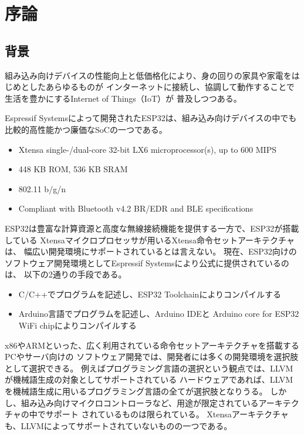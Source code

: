 \chapter{序論}
\label{chap:introduction}

\section{背景}
\label{section:background}

組み込み向けデバイスの性能向上と低価格化により、身の回りの家具や家電をはじめとしたあらゆるものが
インターネットに接続し、協調して動作することで生活を豊かにするInternet of Things（IoT）が
普及しつつある。

Espressif Systemsによって開発されたESP32\cite{esp32}は、組み込み向けデバイスの中でも
比較的高性能かつ廉価なSoCの一つである。

\begin{itemize}
  \item Xtensa single-/dual-core 32-bit LX6 microprocessor(s), up to 600 MIPS
  \item 448 KB ROM, 536 KB SRAM
  \item 802.11 b/g/n
  \item Compliant with Bluetooth v4.2 BR/EDR and BLE specifications
\end{itemize}

ESP32は豊富な計算資源と高度な無線接続機能を提供する一方で、ESP32が搭載している
Xtensaマイクロプロセッサが用いるXtensa命令セットアーキテクチャ\cite{xtensa_isa}は、
幅広い開発環境にサポートされているとは言えない。
現在、ESP32向けのソフトウェア開発環境としてEspressif Systemsにより公式に提供されているのは、
以下の2通りの手段である\cite{esp_toolchain}。

\begin{itemize}
  \item C/C++でプログラムを記述し、ESP32 Toolchainによりコンパイルする
  \item Arduino言語でプログラムを記述し、Arduino IDEと
        Arduino core for ESP32 WiFi chipによりコンパイルする
\end{itemize}

x86やARMといった、広く利用されている命令セットアーキテクチャを搭載するPCやサーバ向けの
ソフトウェア開発では、開発者には多くの開発環境を選択肢として選択できる。
例えばプログラミング言語の選択という観点では、LLVMが機械語生成の対象としてサポートされている
ハードウェアであれば、LLVMを機械語生成に用いるプログラミング言語の全てが選択肢となりうる。
しかし、組み込み向けマイクロコントローラなど、用途が限定されているアーキテクチャの中でサポート
されているものは限られている\cite{llvm_matrix}。
Xtensaアーキテクチャも、LLVMによってサポートされていないものの一つである。

